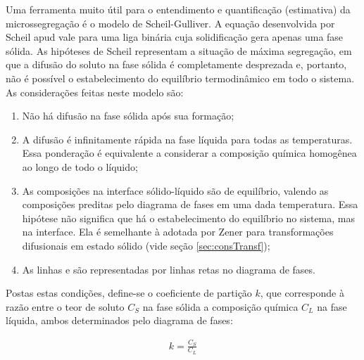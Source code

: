 
Uma ferramenta muito útil para o entendimento e quantificação (estimativa) da microssegregação é o modelo de Scheil-Gulliver. %
A equação desenvolvida por Scheil apud  %
vale para uma liga binária cuja solidificação gera apenas uma fase sólida. As hipóteses de Scheil representam a situação de máxima segregação, em que a difusão do soluto na fase sólida é completamente desprezada e, portanto, não é possível o estabelecimento do equilíbrio termodinâmico em todo o sistema. As considerações feitas neste modelo são:

\begin{enumerate}
  \item Não há difusão na fase sólida após sua formação;
  \item A difusão é infinitamente rápida na fase líquida para todas as temperaturas. Essa ponderação é equivalente a considerar a composição química homogênea ao longo de todo o líquido;
  \item As composições na interface sólido-líquido são de equilíbrio, valendo as composições preditas pelo diagrama de fases em uma dada temperatura. Essa hipótese não significa que há o estabelecimento do equilíbrio no sistema, mas  na interface. Ela é semelhante à adotada por Zener para transformações difusionais em estado sólido (vide seção \ref{sec:consTransf});
  \item As linhas  e  são representadas por linhas retas no diagrama de fases. \label{item:scheil4}
\end{enumerate}

Postas estas condições, define-se o coeficiente de partição $k$, que corresponde à razão entre o teor de soluto $C_S$ na fase sólida a composição química $C_L$ na fase líquida, ambos determinados pelo diagrama de fases:

\begin{subequations}
  \begin{align}
    \label{eq:coefPart}k = \frac{C_S}{C_L}
  \end{align}
\end{subequations}

